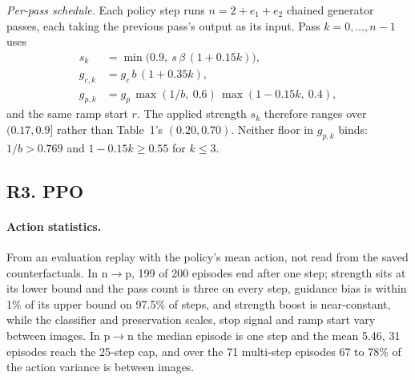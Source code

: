 \emph{Per-pass schedule.} Each policy step runs $n = 2 + e_1 + e_2$ chained generator passes, each taking the previous pass's output as its input. Pass $k = 0, \dots, n-1$ uses
\begin{align*}
s_k &= \min\big(0.9,\ s\,\beta\,(1 + 0.15k)\big), \\
g_{c,k} &= g_c\, b\,(1 + 0.35k), \\
g_{p,k} &= g_p\, \max(1/b,\ 0.6)\, \max(1 - 0.15k,\ 0.4),
\end{align*}
and the same ramp start $r$. The applied strength $s_k$ therefore ranges over $(0.17, 0.9]$ rather than Table~1's $(0.20, 0.70)$. Neither floor in $g_{p,k}$ binds: $1/b > 0.769$ and $1 - 0.15k \geq 0.55$ for $k \leq 3$.

\subsection*{R3. PPO}
\label{sec:repro-ppo}

\paragraph{Action statistics.} From an evaluation replay with the policy's mean action, not read from the saved counterfactuals. In n$\to$p, 199 of 200 episodes end after one step; strength sits at its lower bound and the pass count is three on every step, guidance bias is within 1\% of its upper bound on 97.5\% of steps, and strength boost is near-constant, while the classifier and preservation scales, stop signal and ramp start vary between images. In p$\to$n the median episode is one step and the mean 5.46, 31 episodes reach the 25-step cap, and over the 71 multi-step episodes 67 to 78\% of the action variance is between images.


